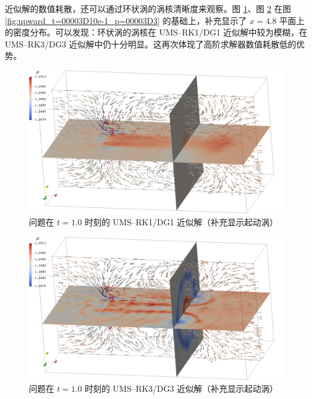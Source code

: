 近似解的数值耗散，还可以通过环状涡的涡核清晰度来观察。图 \ref{fig:upward_p=00003D1}、图 \ref{fig:upward_p=00003D3}
在图 \ref{fig:upward_t=00003D10e-1_p=00003D3} 的基础上，补充显示了 $x=4.8$ 平面上的密度分布。可以发现：环状涡的涡核在
UMS–RK1/DG1 近似解中较为模糊，在 UMS–RK3/DG3 近似解中仍十分明显。这再次体现了高阶求解器数值耗散低的优势。

\begin{figure}[h!]
\begin{centering}
\includegraphics[width=1\textwidth,height=0.26\textheight,keepaspectratio]{../mdpi/figures/rotor_in_tunnel/upward_p=1}
\par\end{centering}
\caption{\label{fig:upward_p=00003D1}问题在
$t=1.0$ 时刻的 UMS–RK1/DG1 近似解（补充显示起动涡）}
\end{figure}

\begin{figure}[h!]
\begin{centering}
\includegraphics[width=1\textwidth,height=0.26\textheight,keepaspectratio]{../mdpi/figures/rotor_in_tunnel/upward_p=3}
\par\end{centering}
\caption{\label{fig:upward_p=00003D3}问题在
$t=1.0$ 时刻的 UMS–RK3/DG3 近似解（补充显示起动涡）}
\end{figure}


